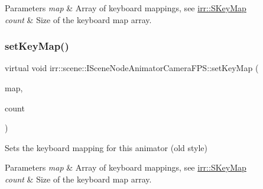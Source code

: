 \begin{DoxyParams}{Parameters}
{\em map} & Array of keyboard mappings, see \hyperlink{structirr_1_1SKeyMap}{irr\+::\+S\+Key\+Map} \\
\hline
{\em count} & Size of the keyboard map array. \\
\hline
\end{DoxyParams}
\mbox{\label{classirr_1_1scene_1_1ISceneNodeAnimatorCameraFPS_a449aba2c0047f895e417a872505c02ce}} 
\subsubsection{\texorpdfstring{set\+Key\+Map()}{setKeyMap()}\hspace{0.1cm}{\footnotesize\ttfamily [2/4]}}
{\footnotesize\ttfamily virtual void irr\+::scene\+::\+I\+Scene\+Node\+Animator\+Camera\+F\+P\+S\+::set\+Key\+Map (\begin{DoxyParamCaption}\item[{\hyperlink{structirr_1_1SKeyMap}{S\+Key\+Map} $\ast$}]{map,  }\item[{\hyperlink{namespaceirr_a0416a53257075833e7002efd0a18e804}{u32}}]{count }\end{DoxyParamCaption})\hspace{0.3cm}{\ttfamily [pure virtual]}}



Sets the keyboard mapping for this animator (old style) 


\begin{DoxyParams}{Parameters}
{\em map} & Array of keyboard mappings, see \hyperlink{structirr_1_1SKeyMap}{irr\+::\+S\+Key\+Map} \\
\hline
{\em count} & Size of the keyboard map array. \\
\hline
\end{DoxyParams}
\mbox{\label{classirr_1_1scene_1_1ISceneNodeAnimatorCameraFPS_a9a76aeafb9fe79a13b7b128b3eb3b103}} 
